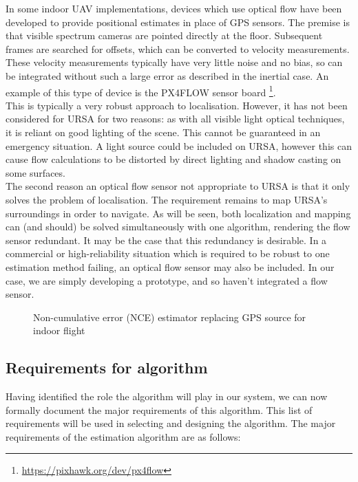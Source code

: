 \documentclass[capstone_report.tex]{subfiles}
\begin{document}
In some indoor UAV implementations, devices which use optical flow have been developed to provide positional estimates in place of GPS sensors. The premise is that visible spectrum cameras are pointed directly at the floor. Subsequent frames are searched for offsets, which can be converted to velocity measurements. These velocity measurements typically have very little noise and no bias, so can be integrated without such a large error as described in the inertial case. An example of this type of device is the PX4FLOW sensor board \footnote{\url{https://pixhawk.org/dev/px4flow}}. \\

This is typically a very robust approach to localisation. However, it has not been considered for URSA for two reasons: as with all visible light optical techniques, it is reliant on good lighting of the scene. This cannot be guaranteed in an emergency situation. A light source could be included on URSA, however this can cause flow calculations to be distorted by direct lighting and shadow casting on some surfaces.\\

The second reason an optical flow sensor not appropriate to URSA is that it only solves the problem of localisation. The requirement remains to map URSA's surroundings in order to navigate. As will be seen, both localization and mapping can (and should) be solved simultaneously with one algorithm, rendering the flow sensor redundant. It may be the case that this redundancy is desirable. In a commercial or high-reliability situation which is required to be robust to one estimation method failing, an optical flow sensor may also be included. In our case, we are simply developing a prototype, and so haven't integrated a flow sensor.

    \begin{figure}[H]
    	\centering
    	
    	\caption{Non-cumulative error (NCE) estimator replacing GPS source for indoor flight\label{fig:estAlg3}}
    \end{figure}

\subsection{Requirements for algorithm}
Having identified the role the algorithm will play in our system, we can now formally document the major requirements of this algorithm. This list of requirements will be used in selecting and designing the algorithm. The major requirements of the estimation algorithm are as follows:
\end{document}
